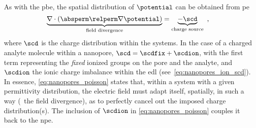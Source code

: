 As with the \gls{pbe}, the spatial distribution of $\potential$ can be obtained from \gls{pe}
%
\begin{equation}\label{eq:nanopores_poisson}
  \underbrace { \nabla \cdot \left(\absperm \relperm \nabla \potential \right) }_{\text{field divergence}}
  = \underbrace{ - \scd }_{\text{charge source}}
  \text{ ,}
\end{equation}
%
where $\scd$ is the charge distribution within the systems. In the case of a charged analyte molecule within a
nanopore, $\scd = \scdfix + \scdion$, with the first term representing the \emph{fixed} ionized groups on the
pore and the analyte, and $\scdion$ the ionic charge imbalance within the \gls{edl}
(see~\cref{eq:nanopores_ion_scd}). In essence, \cref{eq:nanopores_poisson} states that, within a system with a
given permittivity distribution, the electric field must adapt itself, spatially, in such a way (\ie~the field
divergence), as to perfectly cancel out the imposed charge distribution(s). The inclusion of $\scdion$ in
\cref{eq:nanopores_poisson} couples it back to the \gls{npe}.

